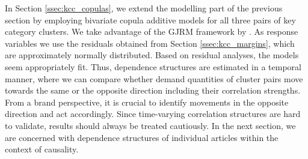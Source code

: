 

In Section \ref{ssec:kcc_copulas}, we extend the modelling part of the previous section by employing bivariate copula additive models for all three pairs of key category clusters. We take advantage of the \ac{GJRM} framework by \cite{marra1605bivariate}. As response variables we use the residuals obtained from Section \ref{ssec:kcc_margins}, which are approximately normally distributed. Based on residual analyses, the models seem appropriately fit. Thus, dependence structures are estimated in a temporal manner, where we can compare whether demand quantities of cluster pairs move towards the same or the opposite direction including their correlation strengths. From a brand perspective, it is crucial to identify movements in the opposite direction and act accordingly. Since time-varying correlation structures are hard to validate, results should always be treated cautiously. In the next section, we are concerned with dependence structures of individual articles within the context of causality.